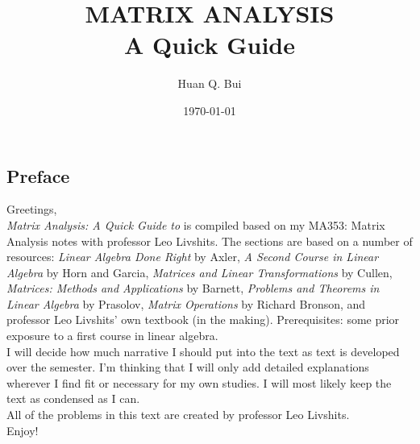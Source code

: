 \documentclass{article}
\theoremstyle{definition}
\begin{document}
	\begin{titlepage}\centering
		\clearpage
		\title{\textsc{\bf{MATRIX ANALYSIS}}\\\smallskip A Quick Guide\\}
		\author{\bigskip Huan Q. Bui}
		\date{\today}
		\maketitle
		\thispagestyle{empty}
	\end{titlepage}

\newpage

\subsection*{Preface}

Greetings,\\

\textit{Matrix Analysis: A Quick Guide to} is compiled based on my MA353: Matrix Analysis notes with professor Leo Livshits. The sections are based on a number of resources: \textit{Linear Algebra Done Right} by Axler, \textit{A Second Course in Linear Algebra} by Horn and Garcia, \textit{Matrices and Linear Transformations} by Cullen, \textit{Matrices: Methods and Applications} by Barnett, \textit{Problems and Theorems in Linear Algebra} by Prasolov, \textit{Matrix Operations} by Richard Bronson, and professor Leo Livshits' own textbook (in the making). Prerequisites: some prior exposure to a first course in linear algebra.\\ 

I will decide how much narrative I should put into the text as text is developed over the semester. I'm thinking that I will only add detailed explanations wherever I find fit or necessary for my own studies. I will most likely keep the text as condensed as I can.\\

All of the problems in this text are created by professor Leo Livshits.\\

Enjoy!


\newpage
\tableofcontents
\newpage
\end{document}
